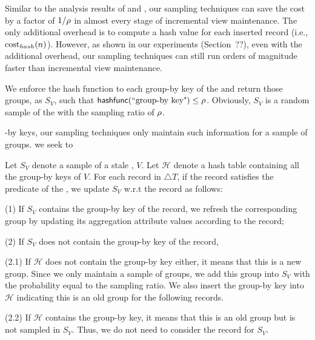 Similar to the analysis results of \spview and \fjview, our sampling techniques can save the cost by a factor of $1/\rho $ in almost every stage of incremental view maintenance. The only additional overhead is to compute a hash value for each inserted record (i.e., $\textrm{cost}_{hash}(n)$). However, as shown in our experiments (Section~??), even with the additional overhead, our sampling techniques can still run orders of magnitude faster than incremental view maintenance.  

\iffalse
We enforce the hash function to each group-by key of the \aggview and return those groups, as $S_{V}$, such that $\textsf{hashfunc}(\textrm{``group-by key"}) \leq \rho $. Obviously, $S_{V}$ is a random sample of the \aggview with the sampling ratio of $\rho $. 

-by keys, our sampling techniques only maintain such information for a sample of groups. we seek to 


 

Let $S_{V}$ denote a sample of a stale \aggview, $V$. Let $\mathcal{H}$ denote a hash table containing all the group-by keys of $V$. For each record in $\triangle T$, if the record satisfies the predicate of the \aggview, we update $S_{V}$ w.r.t the record as follows: 
\vspace{.25em}

(1) If $S_{V}$ contains the group-by key of the record, we refresh the corresponding group by updating its aggregation attribute values according to the record;

\vspace{.25em}

(2) If $S_{V}$ does not contain the group-by key of the record,

\vspace{.25em}

(2.1) If $\mathcal{H}$ does not contain the group-by key either, it means that this is a new group. Since we only maintain a sample of groups, we add this group into $S_{V}$ with the probability equal to the sampling ratio. We also insert the group-by key into $\mathcal{H}$ indicating this is an old group for the following records.

\vspace{.25em}

(2.2) If $\mathcal{H}$ contains the group-by key, it means that this is an old group but is not sampled in $S_{V}$. Thus, we do not need to consider the record for $S_{V}$.




